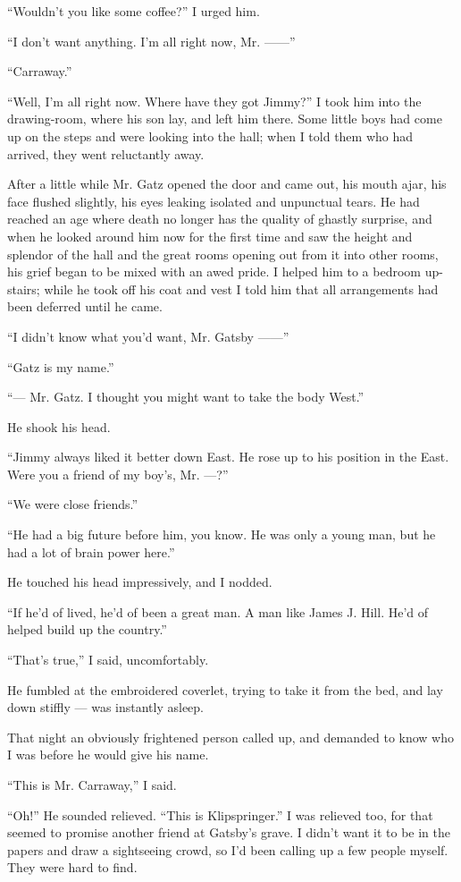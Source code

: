\documentclass{znotebook}
\begin{document}
``Wouldn't you like some coffee?'' I urged him.

``I don't want anything. I'm all right now, Mr. ——''

``Carraway.''

``Well, I'm all right now. Where have they got Jimmy?'' I took him into the drawing-room, where his son lay, and left him there. Some little boys had come up on the steps and were looking into the hall; when I told them who had arrived, they went reluctantly away.

After a little while Mr. Gatz opened the door and came out, his mouth ajar, his face flushed slightly, his eyes leaking isolated and unpunctual tears. He had reached an age where death no longer has the quality of ghastly surprise, and when he looked around him now for the first time and saw the height and splendor of the hall and the great rooms opening out from it into other rooms, his grief began to be mixed with an awed pride. I helped him to a bedroom up-stairs; while he took off his coat and vest I told him that all arrangements had been deferred until he came.

``I didn't know what you'd want, Mr. Gatsby ——''

``Gatz is my name.''

``— Mr. Gatz. I thought you might want to take the body West.''

He shook his head.

``Jimmy always liked it better down East. He rose up to his position in the East. Were you a friend of my boy's, Mr. —?''

``We were close friends.''

``He had a big future before him, you know. He was only a young man, but he had a lot of brain power here.''

He touched his head impressively, and I nodded.

``If he'd of lived, he'd of been a great man. A man like James J. Hill. He'd of helped build up the country.''

``That's true,'' I said, uncomfortably.

He fumbled at the embroidered coverlet, trying to take it from the bed, and lay down stiffly — was instantly asleep.

That night an obviously frightened person called up, and demanded to know who I was before he would give his name.

``This is Mr. Carraway,'' I said.

``Oh!'' He sounded relieved. ``This is Klipspringer.'' I was relieved too, for that seemed to promise another friend at Gatsby's grave. I didn't want it to be in the papers and draw a sightseeing crowd, so I'd been calling up a few people myself. They were hard to find.
\end{document}

